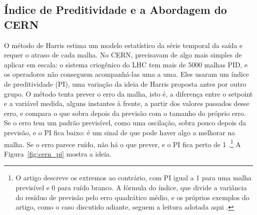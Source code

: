 \subsection{Índice de Preditividade e a Abordagem do CERN}

O método de Harris estima um modelo estatístico da série temporal da saída e requer o atraso de cada malha. No CERN,  precisavam de algo mais simples de aplicar em escala: o sistema criogênico do LHC tem mais de 5000 malhas PID, e os operadores não conseguem acompanhá-las uma a uma. Eles usaram um índice de preditividade (PI), uma variação da ideia de Harris proposta antes por outro grupo. O método tenta prever o erro da malha, isto é, a diferença entre o setpoint e a variável medida, alguns instantes à frente, a partir dos valores passados desse erro, e compara o que sobra depois da previsão com o tamanho do próprio erro. Se o erro tem um padrão previsível, como uma oscilação, sobra pouco depois da previsão, e o PI fica baixo: é um sinal de que pode haver algo a melhorar na malha. Se o erro parece ruído, não há o que prever, e o PI fica perto de 1 \cite{Bradu2018}.\footnote{O artigo descreve os extremos ao contrário, com PI igual a 1 para uma malha previsível e 0 para ruído branco. A fórmula do índice, que divide a variância do resíduo de previsão pelo erro quadrático médio, e os próprios exemplos do artigo, como o caso discutido adiante, seguem a leitura adotada aqui \cite{Bradu2018}.} A Figura~\ref{fig:cern_pi} mostra a ideia.

